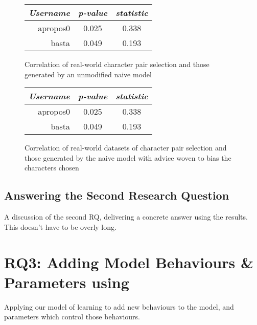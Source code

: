 \begin{figure}[h]
  \centering
  
  \begin{minipage}{.45\textwidth}
    \centering
    \begin{tabular}{r|c|c}
      \emph{Username} & \emph{p-value} & \emph{\tau{} statistic} \\\hline\hline
      apropos0 & 0.025 & 0.338 \\
      basta & 0.049 & 0.193 \\
    \end{tabular}
    \caption{Correlation of real-world character pair selection and those generated by an unmodified naive model}
    \label{prior_distribution_results_table_comparison_to_real_world_datasets}
  \end{minipage}\hfill
  \begin{minipage}{.45\textwidth}
    \centering
    \begin{tabular}{r|c|c}
      \emph{Username} & \emph{p-value} & \emph{\tau{} statistic} \\\hline\hline
      apropos0 & 0.025 & 0.338 \\
      basta & 0.049 & 0.193 \\
    \end{tabular}
    \caption{Correlation of real-world datasets of character pair selection and those generated by the naive model with advice woven to bias the characters chosen}
    \label{prior_distribution_results_table_comparison_to_real_world_datasets}
  \end{minipage}

\end{figure}




\subsection{Answering the Second Research Question}

A discussion of the second RQ, delivering a concrete answer using the results.
This doesn't have to be overly long.



\section{RQ3: Adding Model Behaviours \& Parameters using \AspectOrientation}
\label{rq3_results}

Applying our model of learning to add new behaviours to the model, and
parameters which control those behaviours.

